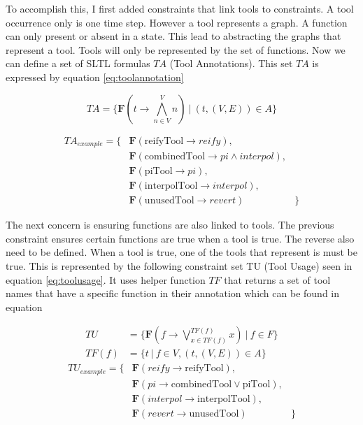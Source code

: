 \documentclass{article}
\begin{document}
To accomplish this, I first added constraints that link tools to constraints. A tool occurrence only is one time step. However a tool represents a graph. A function can only present or absent in a state. This lead to abstracting the graphs that represent a tool. Tools will only be represented by the set of functions. Now we can define a set of SLTL formulas $TA$ (Tool Annotations). This set $TA$ is expressed by equation \ref{eq:toolannotation} 

\begin{equation}
    TA = \{ \textbf{F}(t \rightarrow \bigwedge^V_{n \in V} n)\ |\ (t,(V,E))  \in A \} \label{eq:toolannotation}
\end{equation}

\begin{align*}
    TA_{example} = \{& \textbf{F}( \text{reifyTool} \rightarrow reify), &\\
    & \textbf{F}( \text{combinedTool} \rightarrow pi \wedge interpol), &\\
    & \textbf{F}( \text{piTool} \rightarrow pi), &\\
    & \textbf{F}( \text{interpolTool} \rightarrow interpol), &\\
    &\textbf{F}( \text{unusedTool} \rightarrow revert) & \}
\end{align*}

The next concern is ensuring functions are also linked to tools. The previous constraint ensures certain functions are true when a tool is true. The reverse also need to be defined. When a tool is true, one of the tools that represent is must be true. This is represented by the following constraint set TU (Tool Usage) seen in equation \ref{eq:toolusage}. It uses helper function $TF$ that returns a set of tool names that have a specific function in their annotation which can be found in equation  

\begin{align}
    TU &=  \{  \textbf{F} ( f \rightarrow \bigvee^{TF(f)}_{x \in TF(f)} x )\ |\ f \in F \} \label{eq:toolusage}\\
    TF(f) &= \{ t\ |\ f \in V, (t,(V,E))  \in A  \}
\end{align}
\begin{align*}
    TU_{example}= \{&\textbf{F} (reify \rightarrow \text{reifyTool}), &\\
    &\textbf{F} (pi \rightarrow \text{combinedTool} \vee \text{piTool}), &\\
    &\textbf{F} (interpol  \rightarrow \text{interpolTool}),& \\
    &\textbf{F} (revert  \rightarrow \text{unusedTool}) &\} 
\end{align*}
\end{document}
